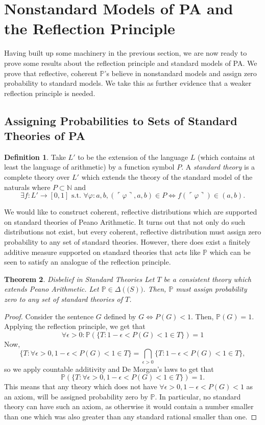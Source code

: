 \documentclass[12pt]{article}
\newcommand{\PP}{\mathbb{P}}
\newcommand{\vp}{\varphi}
\theoremstyle{plain}
\newtheorem{theorem}{Theorem}[subsection]
\theoremstyle{definition}
\newtheorem{definition}[theorem]{Definition}
\theoremstyle{remark}
\begin{document}
\section{Nonstandard Models of PA and the Reflection Principle}
\label{nonstandard-models}
Having built up some machinery in the previous section, we are now ready to prove some results about the reflection principle and standard models of PA. We prove that reflective, coherent $\PP$'s believe in nonstandard models and assign zero probability to standard models. We take this as further evidence that a weaker reflection principle is needed.
\subsection{Assigning Probabilities to Sets of Standard Theories of PA}
\begin{definition}
Take $L'$ to be the extension of the language $L$ (which contains at least the language of arithmetic) by a function symbol $P$. A \emph{standard theory} is a complete theory over $L'$ which extends the theory of the standard model of the naturals where $P\subset\mathbb{N}$ and 
$$\exists f : L'\rightarrow[0, 1] \text{ s.t. } \forall \vp: a, b, (\ulcorner \vp \urcorner, a, b) \in P \iff f(\ulcorner \vp \urcorner) \in (a, b).$$
\end{definition}
We would like to construct coherent, reflective distributions which are supported on standard theories of Peano Arithmetic. It turns out that not only do such distributions not exist, but every coherent, reflective distribution must assign zero probability to any set of standard theories. However, there does exist a finitely additive measure supported on standard theories that acts like $\PP$ which can be seen to satisfy an analogue of the reflection principle.
\begin{theorem} \emph{Disbelief in Standard Theories}
Let $T$ be a consistent theory which extends Peano Arithmetic.
Let $\PP\in\Delta(\mathcal(S))$.
Then, $\PP$ must assign probability zero to any set of standard theories of $T$.
\end{theorem}
\begin{proof}
Consider the sentence $G$ defined by $G \iff P(G) < 1$.
Then, $\PP(G)=1$.
Applying the reflection principle, we get that 
$$\forall\epsilon>0: \PP(\{T:1-\epsilon<P(G)<1\in T\})=1$$
Now, 
$$\{T:\forall \epsilon>0,1-\epsilon<P(G)<1\in T\}=\bigcap_{\epsilon>0}\{T:1-\epsilon<P(G)<1\in T\},$$ so we apply countable additivity and De Morgan's laws to get that $$\PP(\{T:\forall \epsilon>0,1-\epsilon<P(G)<1\in T\})=1.$$
This means that any theory which does not have $\forall \epsilon>0,1-\epsilon<P(G)<1$ as an axiom, will be assigned probability zero by $\PP$.
In particular, no standard theory can have such an axiom, as otherwise it would contain a number smaller than one which was also greater than any standard rational smaller than one.
\end{proof}
\end{document}
